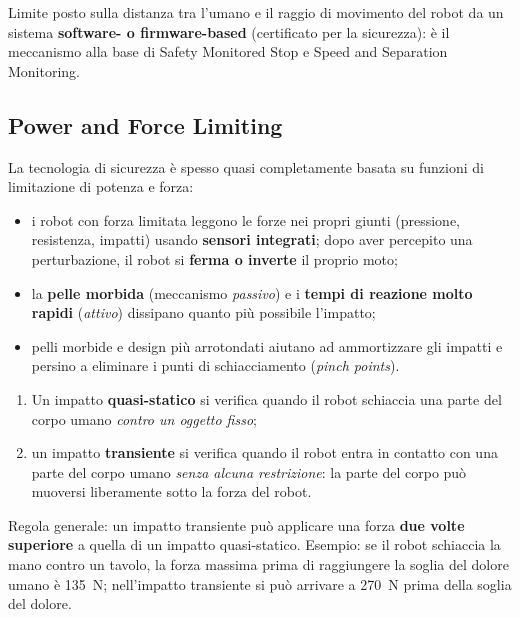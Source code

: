\begin{note}
Limite posto sulla distanza tra l'umano e il raggio di movimento del robot da un sistema \textbf{software- o firmware-based} (certificato per la sicurezza): è il meccanismo alla base di Safety Monitored Stop e Speed and Separation Monitoring.
\end{note}

\subsection{Power and Force Limiting}
La tecnologia di sicurezza è spesso quasi completamente basata su funzioni di limitazione di potenza e forza:
\begin{itemize}
    \item i robot con forza limitata leggono le forze nei propri giunti (pressione, resistenza, impatti) usando \textbf{sensori integrati}; dopo aver percepito una perturbazione, il robot si \textbf{ferma o inverte} il proprio moto;
    \item la \textbf{pelle morbida} (meccanismo \emph{passivo}) e i \textbf{tempi di reazione molto rapidi} (\emph{attivo}) dissipano quanto più possibile l'impatto;
    \item pelli morbide e design più arrotondati aiutano ad ammortizzare gli impatti e persino a eliminare i punti di schiacciamento (\emph{pinch points}).
\end{itemize}

\begin{defn}
\begin{enumerate}
    \item Un impatto \textbf{quasi-statico} si verifica quando il robot schiaccia una parte del corpo umano \emph{contro un oggetto fisso};
    \item un impatto \textbf{transiente} si verifica quando il robot entra in contatto con una parte del corpo umano \emph{senza alcuna restrizione}: la parte del corpo può muoversi liberamente sotto la forza del robot.
\end{enumerate}
Regola generale: un impatto transiente può applicare una forza \textbf{due volte superiore} a quella di un impatto quasi-statico. Esempio: se il robot schiaccia la mano contro un tavolo, la forza massima prima di raggiungere la soglia del dolore umano è 135~N; nell'impatto transiente si può arrivare a 270~N prima della soglia del dolore.
\end{defn}

